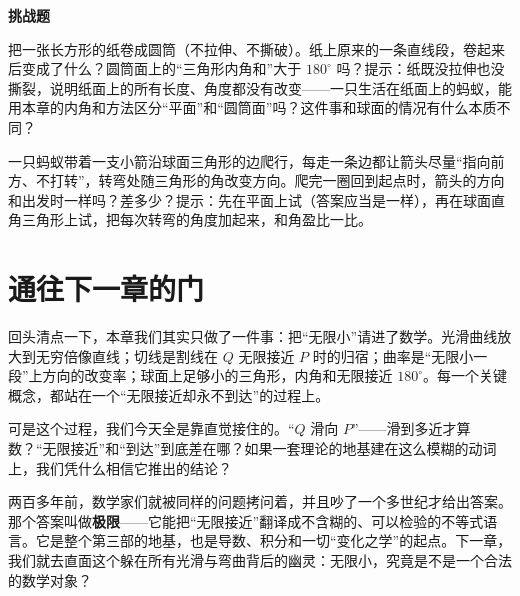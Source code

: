 \textbf{挑战题}

\begin{sikao}
  \item 把一张长方形的纸卷成圆筒（不拉伸、不撕破）。纸上原来的一条直线段，卷起来后变成了什么？圆筒面上的``三角形内角和''大于 $180^\circ$ 吗？提示：纸既没拉伸也没撕裂，说明纸面上的所有长度、角度都没有改变——一只生活在纸面上的蚂蚁，能用本章的内角和方法区分``平面''和``圆筒面''吗？这件事和球面的情况有什么本质不同？
  \item 一只蚂蚁带着一支小箭沿球面三角形的边爬行，每走一条边都让箭头尽量``指向前方、不打转''，转弯处随三角形的角改变方向。爬完一圈回到起点时，箭头的方向和出发时一样吗？差多少？提示：先在平面上试（答案应当是一样），再在球面直角三角形上试，把每次转弯的角度加起来，和角盈比一比。
\end{sikao}

\section*{通往下一章的门}

回头清点一下，本章我们其实只做了一件事：把``无限小''请进了数学。光滑曲线放大到无穷倍像直线；切线是割线在 $Q$ 无限接近 $P$ 时的归宿；曲率是``无限小一段''上方向的改变率；球面上足够小的三角形，内角和无限接近 $180^\circ$。每一个关键概念，都站在一个``无限接近却永不到达''的过程上。

可是这个过程，我们今天全是靠直觉接住的。``$Q$ 滑向 $P$''——滑到多近才算数？``无限接近''和``到达''到底差在哪？如果一套理论的地基建在这么模糊的动词上，我们凭什么相信它推出的结论？

两百多年前，数学家们就被同样的问题拷问着，并且吵了一个多世纪才给出答案。那个答案叫做\textbf{极限}——它能把``无限接近''翻译成不含糊的、可以检验的不等式语言。它是整个第三部的地基，也是导数、积分和一切``变化之学''的起点。下一章，我们就去直面这个躲在所有光滑与弯曲背后的幽灵：无限小，究竟是不是一个合法的数学对象？
